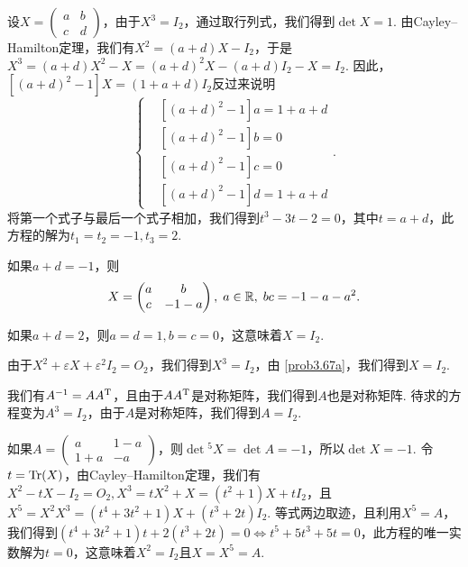 \begin{solution}
  \begin{inparaenum}[(a)]
    \item 设$X=\begin{pmatrix}
      a & b \\
      c & d
    \end{pmatrix}$，由于$X^3=I_2$，通过取行列式，我们得到$\det X=1$. 由Cayley--Hamilton定理，我们有$X^2=(a+d)X-I_2$，于是$X^3=(a+d)X^2-X=(a+d)^2X-(a+d)I_2-X=I_2$. 因此，$[(a+d)^2-1]X=(1+a+d)I_2$反过来说明
    \[
      \left\{
        \begin{aligned}
          & [(a+d)^2-1]a = 1 + a + d \\
          & [(a+d)^2-1]b = 0 \\
          & [(a+d)^2-1]c = 0 \\
          & [(a+d)^2-1]d = 1 + a + d
        \end{aligned}
      \right..
    \]
  将第一个式子与最后一个式子相加，我们得到$t^3-3t-2=0$，其中$t=a+d$，此方程的解为$t_1=t_2=-1,t_3=2$.

  如果$a+d=-1$，则
  \[
    X = \begin{pmatrix}
      a & b \\
      c & -1-a
    \end{pmatrix},\;a\in\mathbb R,\; bc = -1 - a - a^2.
  \]

  如果$a+d=2$，则$a=d=1,b=c=0$，这意味着$X=I_2$.

  \item 由于$X^2+\varepsilon X+\varepsilon^2 I_2=O_2$，我们得到$X^3=I_2$，由 \ref{prob3.67a}，我们得到$X=I_2$.
  \end{inparaenum}
\end{solution}

\begin{solution}
  我们有$A^{-1}=AA^{\mathrm T}$，且由于$AA^{\mathrm T}$是对称矩阵，我们得到$A$也是对称矩阵. 待求的方程变为$A^3=I_2$，由于$A$是对称矩阵，我们得到$A=I_2$.
\end{solution}

\setcounter{solution}{70}

\begin{solution}
  如果$A=\begin{pmatrix}
    a & 1-a \\
    1+a & -a
  \end{pmatrix}$，则$\det{}^5X=\det A=-1$，所以$\det X=-1$. 令$t=\operatorname{Tr}(X)$，由Cayley--Hamilton定理，我们有$X^2-tX-I_2=O_2,X^3=tX^2+X=(t^2+1)X+tI_2$，且$X^5=X^2X^3=
  (t^4+3t^2+1)X+(t^3+2t)I_2$. 等式两边取迹，且利用$X^5=A$，我们得到$(t^4+3t^2+1)t+2(t^3+2t)=0\Leftrightarrow
  t^5+5t^3+5t=0$，此方程的唯一实数解为$t=0$，这意味着$X^2=I_2$且$X=X^5=A$.
\end{solution}

